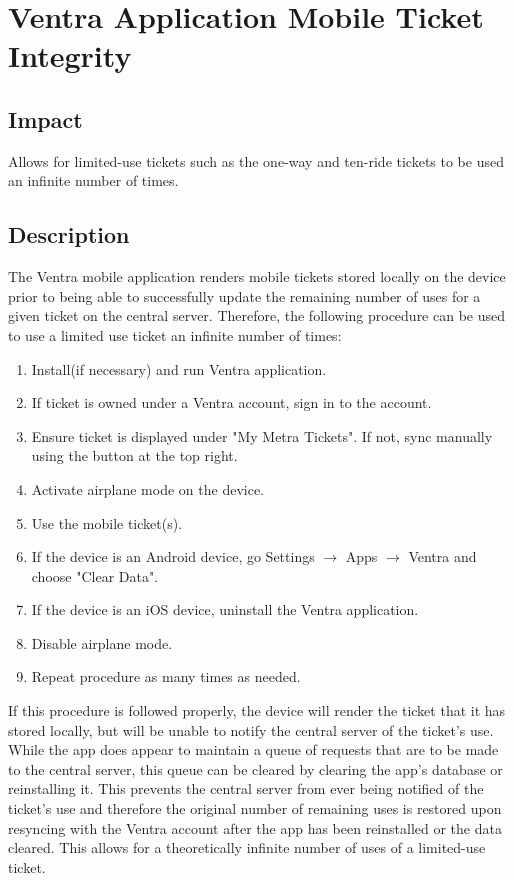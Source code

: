 \documentclass[12pt,conference]{IEEEtran}
\begin{document}
\section{Ventra Application Mobile Ticket Integrity}

\subsection{Impact}
Allows for limited-use tickets such as the one-way and ten-ride tickets to be used an infinite number of times.

\subsection{Description}
The Ventra mobile application renders mobile tickets stored locally on the device prior to being able to successfully update the remaining number of uses for a given ticket on the central server. Therefore, the following procedure can be used to use a limited use ticket an infinite number of times:
\begin{enumerate}
        \item Install(if necessary) and run Ventra application.
        \item If ticket is owned under a Ventra account, sign in to the account.
        \item Ensure ticket is displayed under "My Metra Tickets". If not, sync manually using the button at the top right.
        \item Activate airplane mode on the device.
        \item Use the mobile ticket(s).
        \item If the device is an Android device, go Settings $\rightarrow$ Apps $\rightarrow$ Ventra and choose "Clear Data".
        \item If the device is an iOS device, uninstall the Ventra application.
        \item Disable airplane mode.
        \item Repeat procedure as many times as needed.
\end{enumerate}
If this procedure is followed properly, the device will render the ticket that it has stored locally, but will be unable to notify the central server of the ticket's use. While the app does appear to maintain a queue of requests that are to be made to the central server, this queue can be cleared by clearing the app's database or reinstalling it. This prevents the central server from ever being notified of the ticket's use and therefore the original number of remaining uses is restored upon resyncing with the Ventra account after the app has been reinstalled or the data cleared. This allows for a theoretically infinite number of uses of a limited-use ticket.
\end{document}
